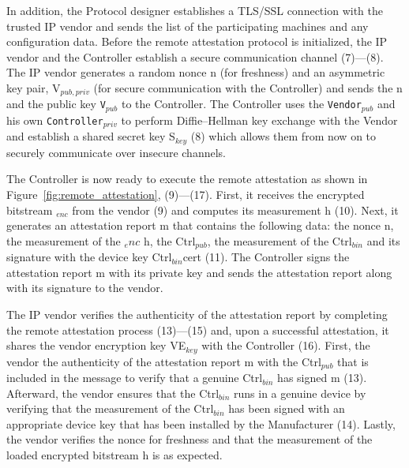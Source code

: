 In addition, the Protocol designer establishes a TLS/SSL connection with the trusted IP vendor and sends the list of the participating machines and any configuration data. Before the remote attestation protocol is initialized, the IP vendor and the Controller establish a secure communication channel (7)---(8). The IP vendor generates a random nonce n (for freshness) and an asymmetric key pair, V$_{pub, priv}$ (for secure communication with the Controller) and  sends the n and the public key \texttt{V}$_{pub}$ to the Controller. The Controller uses the \texttt{Vendor}$_{pub}$ and his own \texttt{Controller}$_{priv}$ to perform Diffie–Hellman key exchange with the Vendor and establish a shared secret key S$_{key}$ (8) which allows them from now on to securely communicate over insecure channels.

 The Controller is now ready to execute the remote attestation as shown in Figure~\ref{fig:remote_attestation}, (9)---(17). First, it receives the encrypted bitstream \projecttitle{}$_{enc}$ from the vendor (9) and computes its measurement h (10). Next, it generates an attestation report m that contains the following data: the nonce n, the measurement of the \projecttitle{}$_enc$ h, the Ctrl$_{pub}$, the measurement of the Ctrl$_{bin}$ and its signature with the device key Ctrl$_{bin}$cert (11). The Controller signs the attestation report m with its private key and sends the attestation report along with its signature to the vendor.%

The IP vendor verifies the authenticity of the attestation report by completing the remote attestation process (13)---(15) and, upon a successful attestation, it shares the vendor encryption key VE$_{key}$ with the Controller (16). First, the vendor the authenticity of the attestation report m with the Ctrl$_{pub}$ that is included in the message to verify that a genuine Ctrl$_{bin}$ has signed m (13). Afterward, the vendor ensures that the Ctrl$_{bin}$ runs in a genuine \projecttitle{} device by verifying that the measurement of the Ctrl$_{bin}$ has been signed with an appropriate device key that has been installed by the Manufacturer (14). Lastly, the vendor verifies the nonce for freshness and that the measurement of the loaded encrypted bitstream h is as expected. 

